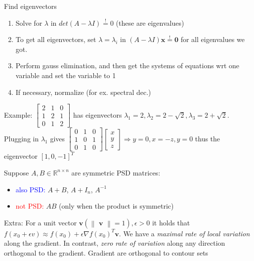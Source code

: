 \documentclass[a4paper]{article}
\begin{document}
\begin{mainbox}{Find eigenvectors}
    \begin{enumerate}[leftmargin=7pt]
        \item Solve for $\lambda$ in $det(A-\lambda I) \overset{!}{=} 0 $ (these are eigenvalues)
        \item To get all eigenvectors, set $\lambda = \lambda_i$ in $(A-\lambda I)\mathbf{x} \overset{!}{=} \mathbf{0} $ for all eigenvalues we got.
        \item Perform gauss elimination, and then get the systems of equations wrt one variable and set the variable to 1
        \item If necessary, normalize (for ex. spectral dec.) 
    \end{enumerate}
    Example:
    $\left[\begin{smallmatrix} 2 & 1 & 0 \\ 1 & 2 & 1 \\ 0 & 1 & 2 \end{smallmatrix}\right] $ has eigenvectors $\lambda_1  = 2, \lambda_2  =2- \sqrt{2}, \lambda_3  = 2 + \sqrt{2}$. Plugging in $\lambda_1$ gives $\left[\begin{smallmatrix} 0 & 1 & 0\\ 1 & 0 & 1\\ 0 & 1 & 0 \end{smallmatrix}\right]\left[\begin{smallmatrix} x \\ y\\ z \end{smallmatrix} \right]\Rightarrow y = 0, x = -z, y =0$ thus the eigenvector $[1, 0, -1]^T$   
\end{mainbox}

Suppose $A,B \in \mathbb{R}^{n\times n}$ are symmetric PSD matrices:
\begin{itemize}
    \item \textcolor{blue}{also PSD:} $A+B$, $A+ I_n$, $A^{-1}$
    \item \textcolor{red}{not PSD:} $AB$ (only when the product is symmetric)    
\end{itemize}

\noindent Extra:
For a unit vector $\textbf{v} (\left\lVert\textbf{ v } \right\rVert= 1), \epsilon > 0$ it holds that $f(x_0 + \epsilon v) \approx f(x_0) + \epsilon \nabla f(x_0)^T\textbf{v} $. We have a \textit{maximal rate of local variation} along the gradient. In contrast, \textit{zero rate of variation} along any direction orthogonal to the gradient. Gradient are orthogonal to contour sets  
\end{document}
